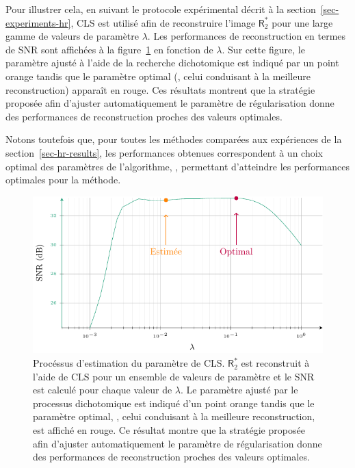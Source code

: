 Pour illustrer cela, en suivant le protocole expérimental décrit à la section~\ref{sec-experiments-hr}, CLS est utilisé afin de reconstruire l'image $\mathsf{R}_2^*$ pour une large gamme de valeurs de paramètre $\lambda$. Les performances de reconstruction en termes de SNR sont affichées à la figure~\ref{fig-lambda_estim} en fonction de $\lambda$. Sur cette figure, le paramètre ajusté à l'aide de la recherche dichotomique est indiqué par un point orange tandis que le paramètre optimal (\ie{}, celui conduisant à la meilleure reconstruction) apparaît en rouge. Ces résultats montrent que la stratégie proposée afin d'ajuster automatiquement le paramètre de régularisation donne des performances de reconstruction proches des valeurs optimales.

Notons toutefois que, pour toutes les méthodes comparées aux expériences de la section~\ref{sec-hr-results}, les performances obtenues correspondent à un choix optimal des paramètres de l'algorithme, \ie{}, permettant d'atteindre les performances optimales pour la méthode.

\begin{figure}[ht!]
    \centering
    \includegraphics{img/chapitre4/figure14/cls-parameter.pdf}
    \caption{Procéssus d'estimation du paramètre de CLS. $\mathsf{R}_2^*$ est reconstruit à l'aide de CLS pour un ensemble de valeurs de paramètre et le SNR est calculé pour chaque valeur de $\lambda$. Le paramètre ajusté par le processus dichotomique est indiqué d'un point orange tandis que le paramètre optimal, \ie{}, celui conduisant à la meilleure reconstruction, est affiché en rouge. Ce résultat montre que la stratégie proposée afin d'ajuster automatiquement le paramètre de régularisation donne des performances de reconstruction proches des valeurs optimales.
        \protect\label{fig-lambda_estim}}
\end{figure}


